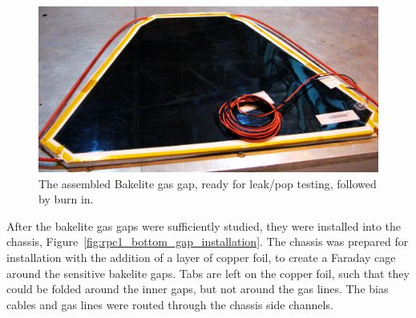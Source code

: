 \begin{figure}
  \centering
  \includegraphics[width=0.7\linewidth]{./figures/rpc1_construction_3}
  \caption{
    The assembled Bakelite gas gap, ready for leak/pop testing, followed by burn
    in.
  }
  \label{fig:rpc1_construction_3}
\end{figure}

After the bakelite gas gaps were sufficiently studied, they were installed into
the chassis, Figure~\ref{fig:rpc1_bottom_gap_installation}. The chassis was
prepared for installation with the addition of a layer of copper foil, to create
a Faraday cage around the sensitive bakelite gaps. Tabs are left on the copper
foil, such that they could be folded around the inner gaps, but not around the
gas lines. The bias cables and gas lines were routed through the chassis side
channels.

